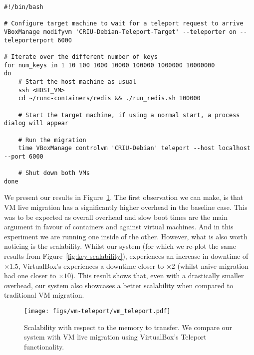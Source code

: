 \begin{lstlisting}[style=Bash,caption={Script to teleport a VirtualBox VM, and run the macrobenchmark.},label={code:vm-teleport}]
#!/bin/bash

# Configure target machine to wait for a teleport request to arrive
VBoxManage modifyvm 'CRIU-Debian-Teleport-Target' --teleporter on --teleporterport 6000

# Iterate over the different number of keys
for num_keys in 1 10 100 1000 10000 100000 1000000 10000000
do
    # Start the host machine as usual
    ssh <HOST_VM>
    cd ~/runc-containers/redis && ./run_redis.sh 100000

    # Start the target machine, if using a normal start, a process dialog will appear

    # Run the migration
    time VBoxManage controlvm 'CRIU-Debian' teleport --host localhost --port 6000

    # Shut down both VMs
done
\end{lstlisting}

We present our results in Figure~\ref{fig:vm-teleport}.
The first observation we can make, is that VM live migration has a significantly higher overhead in the baseline case.
This was to be expected as overall overhead and slow boot times are the main argument in favour of containers and against virtual machines.
And in this experiment we are running one inside of the other.
However, what is also worth noticing is the scalability.
Whilst our system (for which we re-plot the same results from Figure~\ref{fig:key-scalability}), experiences an increase in downtime of $\times 1.5$, VirtualBox's experiences a downtime closer to $\times 2$ (whilst naive migration had one closer to $\times 10$).
This result shows that, even with a drastically smaller overhead, our system also showcases a better scalability when compared to traditional VM migration.

\begin{figure}[h!]
    \centering
    \texttt{[image: figs/vm-teleport/vm\_teleport.pdf]}
    \caption[Scalability comparison with VirtualBox Teleport.]{Scalability with respect to the memory to transfer. We compare our system with VM live migration using VirtualBox's Teleport functionality.\label{fig:vm-teleport}}
\end{figure}
